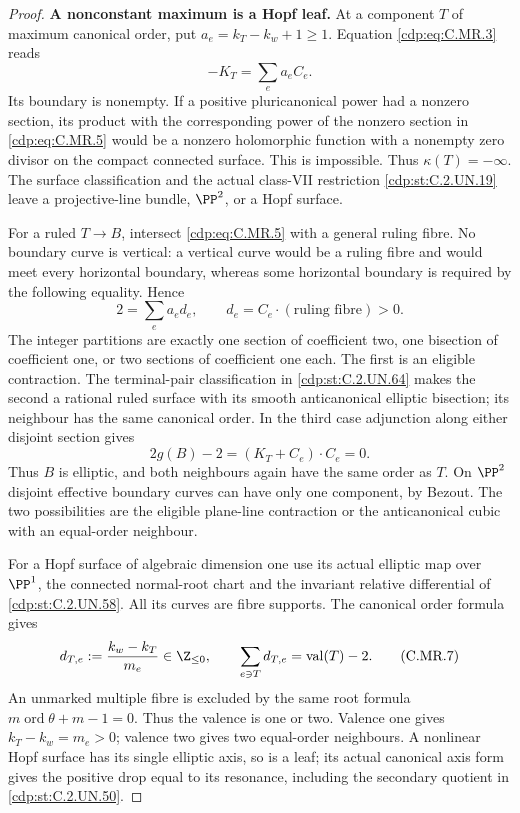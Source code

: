 \begin{proof}
\par\medskip\noindent\textbf{A nonconstant maximum is a Hopf leaf.}
At a component $T$ of maximum canonical order, put
$a_e=k_T-k_w+1\ge1$. Equation \eqref{cdp:eq:C.MR.3} reads
\[
                         -K_T=\sum_e a_eC_e.
\tag{C.MR.5}\label{cdp:eq:C.MR.5}
\]
Its boundary is nonempty. If a positive pluricanonical
power had a nonzero section, its product with the
corresponding power of the nonzero section in \eqref{cdp:eq:C.MR.5}
would be a nonzero holomorphic function with a nonempty
zero divisor on the compact connected surface. This is
impossible. Thus $\kappa(T)=-\infty$. The surface
classification and the actual class-VII restriction \ref{cdp:st:C.2.UN.19}
leave a projective-line bundle, $\PP^2$, or a Hopf
surface.

For a ruled $T\to B$, intersect \eqref{cdp:eq:C.MR.5} with a general
ruling fibre. No boundary curve is vertical: a vertical
curve would be a ruling fibre and would meet every
horizontal boundary, whereas some horizontal boundary
is required by the following equality. Hence
\[
              2=\sum_e a_ed_e,\qquad
              d_e=C_e\cdot(\text{ruling fibre})>0.
\tag{C.MR.6}\label{cdp:eq:C.MR.6}
\]
The integer partitions are exactly one section of
coefficient two, one bisection of coefficient one,
or two sections of coefficient one each. The first
is an eligible contraction. The terminal-pair
classification in \ref{cdp:st:C.2.UN.64} makes the second a rational
ruled surface with its smooth anticanonical elliptic
bisection; its neighbour has the same canonical order.
In the third case adjunction along either disjoint
section gives
\[
       2g(B)-2=(K_T+C_e)\cdot C_e=0.
\]
Thus $B$ is elliptic, and both neighbours again have
the same order as $T$. On $\PP^2$ disjoint effective
boundary curves can have only one component, by
Bezout. The two possibilities are the eligible
plane-line contraction or the anticanonical cubic
with an equal-order neighbour.

For a Hopf surface of algebraic dimension one use
its actual elliptic map over $\PP^1$, the connected
normal-root chart and the invariant relative
differential of \ref{cdp:st:C.2.UN.58}. All its curves are fibre
supports. The canonical order formula gives
\[
 d_{T,e}:=\frac{k_w-k_T}{m_e}\in\Z_{\le0},
 \qquad
              \sum_{e\ni T}d_{T,e}
                                  =\operatorname{val}(T)-2.
\tag{C.MR.7}\label{cdp:eq:C.MR.7}
\]
An unmarked multiple fibre is excluded by the same
root formula $m\operatorname{ord}\theta+m-1=0$.
Thus the valence is one or two. Valence one gives
$k_T-k_w=m_e>0$; valence two gives two equal-order
neighbours. A nonlinear Hopf surface has its single
elliptic axis, so is a leaf; its actual canonical
axis form gives the positive drop equal to its
resonance, including the secondary quotient in \ref{cdp:st:C.2.UN.50}.


\end{proof}
